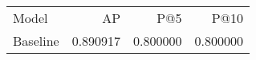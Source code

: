 \begin{tabular}{lrrr}
Model & AP & P@5 & P@10 \\
Baseline & 0.890917 & 0.800000 & 0.800000 \\
\end{tabular}

